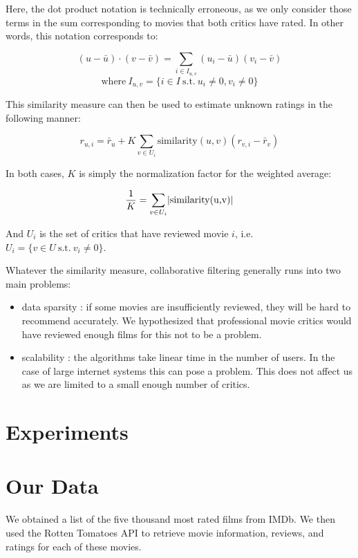 \documentclass[12pt]{article}
\DeclarePairedDelimiter\abs{\lvert}{\rvert}%
\begin{document}
Here, the dot product notation is technically erroneous, as we only consider
those terms in the sum corresponding to movies that both critics have rated.
In other words, this notation corresponds to:

$$ (u - \bar{u}) \cdot (v - \bar{v}) = 
\sum_{i \in I_{u,v}} (u_i - \bar{u})(v_i - \bar{v}) $$
$$ \text{where} \  I_{u,v} = 
\{ i \in I \  \text{s.t.} \   u_i \neq 0, v_i \neq 0 \} $$

This similarity measure can then be used to estimate unknown ratings in the
following manner:

$$ r_{u,i} = 
\bar{r}_u + K \sum_{v \in U_i} \text{similarity}(u,v) (r_{v,i}-\bar{r}_v) $$

In both cases, $K$ is simply the normalization factor for the weighted average:

$$ \frac{1}{K} = \sum_{v \in U_i} \abs{\text{similarity(u,v)}} $$

And $U_i$ is the set of critics that have reviewed movie $i$, i.e.
$U_i = \{ v \in U \  \text{s.t.} \  v_i \neq 0 \}$.

Whatever the similarity measure, collaborative filtering generally runs into
two main problems:

\begin{itemize}

    \item data sparsity : if some movies are insufficiently reviewed, they will
        be hard to recommend accurately. We hypothesized that professional
        movie critics would have reviewed enough films for this not to be a
        problem.

    \item scalability : the algorithms take linear time in the number of users.
        In the case of large internet systems this can pose a problem. This
        does not affect us as we are limited to a small enough number of
        critics.

\end{itemize}

\section{Experiments}

\section{Our Data}

We obtained a list of the five thousand most rated films from IMDb. We then 
used the Rotten Tomatoes API to retrieve movie information, reviews, and 
ratings for each of these movies.  
\end{document}
